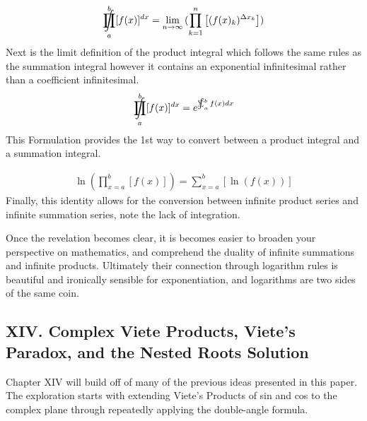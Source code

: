 \documentclass{article}
\DeclareMathOperator*{\SumInt}{%
\mathchoice%
  {\ooalign{$\displaystyle\sum$\cr\hidewidth$\displaystyle\int$\hidewidth\cr}}
  {\ooalign{\raisebox{.14\height}{\scalebox{.7}{$\textstyle\sum$}}\cr\hidewidth$\textstyle\int$\hidewidth\cr}}
  {\ooalign{\raisebox{.2\height}{\scalebox{.6}{$\scriptstyle\sum$}}\cr$\scriptstyle\int$\cr}}
  {\ooalign{\raisebox{.2\height}{\scalebox{.6}{$\scriptstyle\sum$}}\cr$\scriptstyle\int$\cr}}
}
\DeclareMathOperator*{\ProdInt}{%
\mathchoice%
  {\ooalign{$\displaystyle\prod$\cr\hidewidth$\displaystyle\int$\hidewidth\cr}}
  {\ooalign{\raisebox{.14\height}{\scalebox{.7}{$\textstyle\prod$}}\cr\hidewidth$\textstyle\int$\hidewidth\cr}}
  {\ooalign{\raisebox{.2\height}{\scalebox{.6}{$\scriptstyle\prod$}}\cr$\scriptstyle\int$\cr}}
  {\ooalign{\raisebox{.2\height}{\scalebox{.6}{$\scriptstyle\prod$}}\cr$\scriptstyle\int$\cr}}
}
\begin{document}
\begin{align*}
\ProdInt_{a}^{b} [ f(x) ]^{dx} = \lim_{n \to \infty}{(\prod_{k=1}^{n} \left[(f(x)_{k})^{\Delta x_{k}} \right])}
\end{align*}
Next is the limit definition of the product integral which follows the same rules as the summation integral however it contains an exponential infinitesimal rather than a coefficient infinitesimal.
\begin{align*}
\ProdInt_{a}^{b} [ f(x) ]^{dx} = e^{\SumInt_{a}^{b} f(x) dx}
\end{align*}
This Formulation provides the 1st way to convert between a product integral and a summation integral.

\begin{align*}
\ln(\prod_{x=a}^{b} [f(x)])= \sum_{x=a}^{b} [\ln(f(x))]
\end{align*}
Finally, this identity allows for the conversion between infinite product series and infinite summation series, note the lack of integration.

Once the revelation becomes clear, it is becomes easier to broaden your perspective on mathematics, and comprehend the duality of infinite summations and infinite products. Ultimately their connection through logarithm rules is beautiful and ironically sensible for exponentiation, and logarithms are two sides of the same coin.

\newpage
\subsection*{XIV. Complex Viete Products, Viete's Paradox, and the Nested Roots Solution}
Chapter XIV will build off of many of the previous ideas presented in this paper. The exploration starts with extending Viete's Products of sin and cos to the complex plane through repeatedly applying the double-angle formula.
\end{document}
